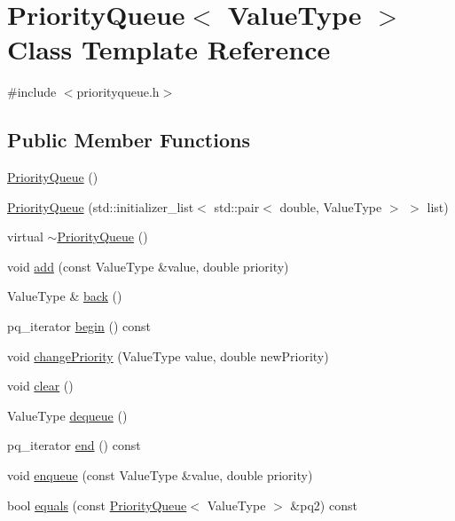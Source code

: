 \hypertarget{classPriorityQueue}{}\section{Priority\+Queue$<$ Value\+Type $>$ Class Template Reference}
\label{classPriorityQueue}


{\ttfamily \#include $<$priorityqueue.\+h$>$}

\subsection*{Public Member Functions}
\begin{DoxyCompactItemize}
\item 
\mbox{\hyperlink{classPriorityQueue_abc81897aed19eefcf321dcb7e12b166d}{Priority\+Queue}} ()
\item 
\mbox{\hyperlink{classPriorityQueue_a3508a0b072e57d2c42cd799a0f89f1f4}{Priority\+Queue}} (std\+::initializer\+\_\+list$<$ std\+::pair$<$ double, Value\+Type $>$ $>$ list)
\item 
virtual \mbox{\hyperlink{classPriorityQueue_af97f1420d96fea6165720866508f06a3}{$\sim$\+Priority\+Queue}} ()
\item 
void \mbox{\hyperlink{classPriorityQueue_aa604cec721b985421df5448c531a4482}{add}} (const Value\+Type \&value, double priority)
\item 
Value\+Type \& \mbox{\hyperlink{classPriorityQueue_a2bad145b40a82c36986f67610313658d}{back}} ()
\item 
pq\+\_\+iterator \mbox{\hyperlink{classPriorityQueue_a8a167c2d310ada97d87241d533544a91}{begin}} () const
\item 
void \mbox{\hyperlink{classPriorityQueue_a32f7f8d063a6cdc2cd726e994d8eae95}{change\+Priority}} (Value\+Type value, double new\+Priority)
\item 
void \mbox{\hyperlink{classPriorityQueue_ac8bb3912a3ce86b15842e79d0b421204}{clear}} ()
\item 
Value\+Type \mbox{\hyperlink{classPriorityQueue_aaee07e371e2370e76e6c42bada727ba2}{dequeue}} ()
\item 
pq\+\_\+iterator \mbox{\hyperlink{classPriorityQueue_a57bd03708d373db49c5d34a781a4d7cb}{end}} () const
\item 
void \mbox{\hyperlink{classPriorityQueue_a25b238c85272091d0662ad153abe058d}{enqueue}} (const Value\+Type \&value, double priority)
\item 
bool \mbox{\hyperlink{classPriorityQueue_aeb5957e78736d9b9cfed5e600166d5f0}{equals}} (const \mbox{\hyperlink{classPriorityQueue}{Priority\+Queue}}$<$ Value\+Type $>$ \&pq2) const

\end{DoxyCompactItemize}

